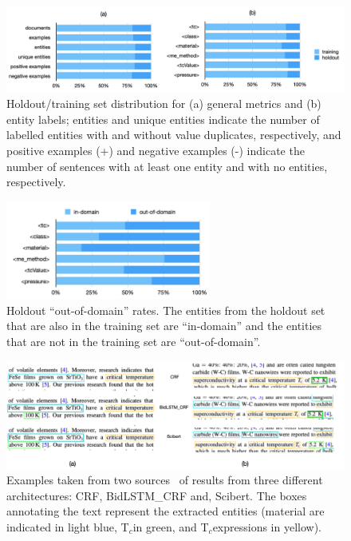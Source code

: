 \documentclass[]{interact}
\theoremstyle{plain}%
\theoremstyle{definition}
\theoremstyle{remark}
\newcommand{\tc}{T$_{c}$}
\begin{document}
\begin{figure}[ht]
    \centering
    \includegraphics[width=\textwidth]{superconductor-holdout-training-set}
    \caption{Holdout/training set distribution for (a) general metrics and (b) entity labels; entities and unique entities indicate the number of labelled entities with and without value duplicates, respectively, and positive examples (+) and negative examples (-) indicate the number of sentences with at least one entity and with no entities, respectively.}
    \label{fig:training-holdout-set-distribution}
\end{figure}

\begin{figure}[ht]
    \centering
    \includegraphics[width=0.6\textwidth]{superconductor-out-domain-holdout-unique}
    \caption{Holdout ``out-of-domain'' rates. The entities from the holdout set that are also in the training set are ``in-domain'' and the entities that are not in the training set are ``out-of-domain''.}
    \label{fig:out-domain-holdout}
\end{figure}

\begin{figure}[ht]
    \centering
    \includegraphics[width=\textwidth]{example-comparison-archs.png}
    \caption{Examples taken from two sources~\cite{Gajda_2016, Shibata_2016} of results from three different architectures: CRF, BidLSTM\_CRF and, Scibert. The boxes annotating the text represent the extracted entities (material are indicated in light blue, \tc in green, and \tc expressions in yellow).}
    \label{fig:example-comparison-architectures}
\end{figure}
\end{document}

